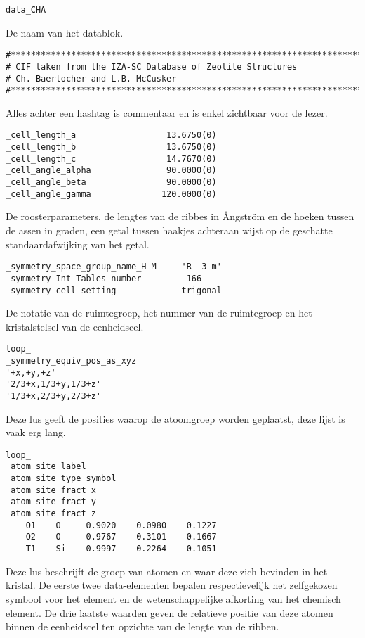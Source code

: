 \begin{lstlisting}
data_CHA
\end{lstlisting}
De naam van het datablok.
\begin{lstlisting}
#**************************************************************************
# CIF taken from the IZA-SC Database of Zeolite Structures
# Ch. Baerlocher and L.B. McCusker
#**************************************************************************
\end{lstlisting}
Alles achter een hashtag is commentaar en is enkel zichtbaar voor de lezer. 
\begin{lstlisting}
_cell_length_a                  13.6750(0)
_cell_length_b                  13.6750(0)
_cell_length_c                  14.7670(0)
_cell_angle_alpha               90.0000(0)
_cell_angle_beta                90.0000(0)
_cell_angle_gamma              120.0000(0)
\end{lstlisting}
De roosterparameters, de lengtes van de ribbes in Ångström en de hoeken tussen de assen in graden, een getal tussen haakjes achteraan wijst op de geschatte standaardafwijking van het getal. 
\begin{lstlisting}
_symmetry_space_group_name_H-M     'R -3 m'
_symmetry_Int_Tables_number         166
_symmetry_cell_setting             trigonal
\end{lstlisting}
De notatie van de ruimtegroep, het nummer van de ruimtegroep en het kristalstelsel van de eenheidscel.
\begin{lstlisting}
loop_
_symmetry_equiv_pos_as_xyz
'+x,+y,+z'
'2/3+x,1/3+y,1/3+z'
'1/3+x,2/3+y,2/3+z'
\end{lstlisting}
Deze lus geeft de posities waarop de atoomgroep worden geplaatst, deze lijst is vaak erg lang.
\begin{lstlisting}
loop_
_atom_site_label
_atom_site_type_symbol
_atom_site_fract_x
_atom_site_fract_y
_atom_site_fract_z
    O1    O     0.9020    0.0980    0.1227
    O2    O     0.9767    0.3101    0.1667
    T1    Si    0.9997    0.2264    0.1051
\end{lstlisting}
Deze lus beschrijft de groep van atomen en waar deze zich bevinden in het kristal. De eerste twee data-elementen bepalen respectievelijk het zelfgekozen symbool voor het element en de wetenschappelijke afkorting van het chemisch element. De drie laatste waarden geven de relatieve positie van deze atomen binnen de eenheidscel ten opzichte van de lengte van de ribben.

